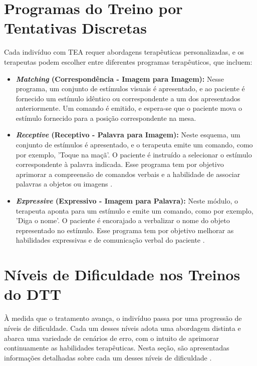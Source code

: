 \section{Programas do Treino por Tentativas Discretas}

Cada indivíduo com TEA requer abordagens terapêuticas personalizadas, 
e os terapeutas podem escolher entre diferentes programas terapêuticos, que incluem:

\begin{itemize}
    \item \textbf{\textit{Matching} (Correspondência - Imagem para Imagem):}
    Nesse programa, um conjunto de estímulos visuais é apresentado, 
    e ao paciente é fornecido um estímulo idêntico ou correspondente a um dos apresentados anteriormente. 
    Um comando é emitido, e espera-se que o paciente mova o estímulo fornecido para a posição correspondente na mesa\cite{artoni2013portable}.

    \item \textbf{\textit{Receptive} (Receptivo - Palavra para Imagem):} 
    Neste esquema, um conjunto de estímulos é apresentado, 
    e o terapeuta emite um comando, como por exemplo, 'Toque na maçã'. 
    O paciente é instruído a selecionar o estímulo correspondente à palavra indicada. 
    Esse programa tem por objetivo aprimorar a compreensão de comandos verbais e a habilidade de associar palavras a objetos ou imagens \cite{Antunes2012}.

    \item \textbf{\textit{Expressive} (Expressivo - Imagem para Palavra): } 
    Neste módulo, o terapeuta aponta para um estímulo e emite um comando, 
    como por exemplo, 'Diga o nome'. 
    O paciente é encorajado a verbalizar o nome do objeto representado no estímulo. 
    Esse programa tem por objetivo melhorar as habilidades expressivas e de comunicação verbal do paciente 
    \cite{artoni2011accessible}.
\end{itemize}

\section{Níveis de Dificuldade nos Treinos do DTT}

À medida que o tratamento avança, 
o indivíduo passa por uma progressão de níveis de dificuldade. 
Cada um desses níveis adota uma abordagem distinta e abarca uma variedade de cenários de erro, 
com o intuito de aprimorar continuamente as habilidades terapêuticas. 
Nesta seção, são apresentadas informações detalhadas sobre cada um desses níveis de dificuldade \cite{artoni2011accessible}.


